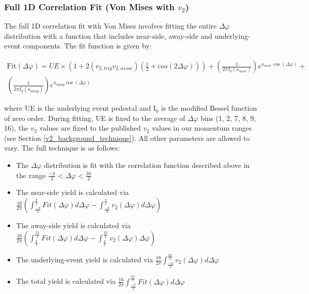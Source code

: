 \documentclass[ALICE,manyauthors]{ALICE_analysis_notes}
\begin{document}
\clearpage

\subsubsection{Full 1D Correlation Fit (Von Mises with $v_{2}$)}
\label{full_correlation_fit_von}
The full 1D correlation fit with  Von Mises involves fitting the entire $\Delta\varphi$ distribution with a function that includes near-side, away-side and underlying-event components. The fit function is given by:

\begin{gather*}
	\text{Fit}(\Delta\varphi) = UE\times(1 + 2(v_{2, trig}v_{2, assoc})(\frac{1}{2} + cos(2\Delta\varphi))) +
	(\frac{1}{2\pi I_{0}(\kappa_{near})})e^{\kappa_{near} \cos(\Delta\varphi)} +  \\
	(\frac{1}{2\pi I_{0}(\kappa_{away})})e^{\kappa_{away} \cos(\Delta\varphi)} 
\end{gather*}

where UE is the underlying event pedestal and I$_0$ is the modified Bessel function of zero order. During fitting, UE is fixed to the average of $\Delta\varphi$ bins (1, 2, 7, 8, 9, 16), the $v_2$ values are fixed to the published $v_2$ values in our momentum ranges (see Section \ref{v2_background_technique}). All other parameters are allowed to vary. The full technique is as follows:

\begin{itemize}
\item The $\Delta\varphi$ distribution is fit with the correlation function described above in the range $\frac{-\pi}{2} < \Delta\varphi < \frac{3\pi}{2}$
\item The near-side yield is calculated via $\frac{16}{2\pi}(\int_{\frac{-\pi}{2}}^{\frac{\pi}{2}}Fit(\Delta\varphi)d\Delta\varphi - \int_{\frac{-\pi}{2}}^{\frac{\pi}{2}}v_{2}(\Delta\varphi) d\Delta\varphi)$
\item The away-side yield is calculated via $\frac{16}{2\pi}(\int_{\frac{\pi}{2}}^{\frac{3\pi}{2}}Fit(\Delta\varphi)d\Delta\varphi - \int_{\frac{\pi}{2}}^{\frac{3\pi}{2}}v_{2}(\Delta\varphi)\Delta\varphi)$
\item The underlying-event yield is calculated via $\frac{16}{2\pi}\int_{\frac{-\pi}{2}}^{\frac{3\pi}{2}}v_{2}(\Delta\varphi) d\Delta\varphi$
\item The total yield is calculated via $\frac{16}{2\pi}\int_{\frac{-\pi}{2}}^{\frac{3\pi}{2}}Fit(\Delta\varphi) d\Delta\varphi$
\end{itemize}
\end{document}

